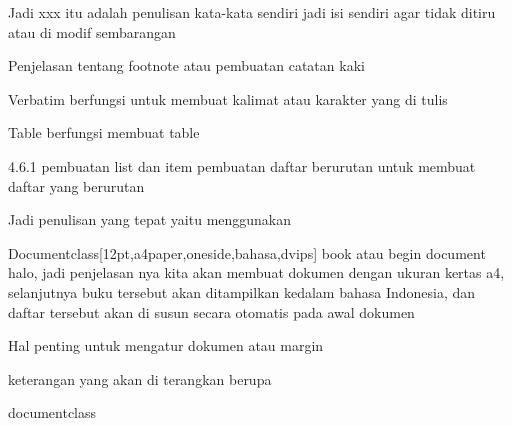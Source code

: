 \vspace{\baselineskip}
Jadi xxx itu adalah penulisan kata-kata sendiri jadi isi sendiri agar tidak ditiru atau di modif sembarangan\par

\vspace{\baselineskip}
\noindent Penjelasan tentang footnote atau pembuatan catatan kaki\par

\vspace{\baselineskip}
Verbatim berfungsi untuk membuat kalimat atau karakter yang di tulis\par

\vspace{\baselineskip}
Table berfungsi membuat table\par

\vspace{\baselineskip}
4.6.1 pembuatan list dan item pembuatan daftar berurutan untuk membuat daftar yang berurutan\par

\vspace{\baselineskip}
Jadi penulisan yang tepat yaitu menggunakan\par

\vspace{\baselineskip}
Documentclass[12pt,a4paper,oneside,bahasa,dvips] book atau begin document halo, jadi penjelasan nya kita akan membuat dokumen dengan ukuran kertas a4, selanjutnya buku tersebut akan ditampilkan kedalam bahasa Indonesia, dan daftar tersebut akan di susun secara otomatis pada awal dokumen\par


\vspace{\baselineskip}
 Hal penting untuk mengatur dokumen atau margin\par

\vspace{\baselineskip}
keterangan yang akan di terangkan berupa\par


\vspace{\baselineskip}
\noindent documentclass\par



